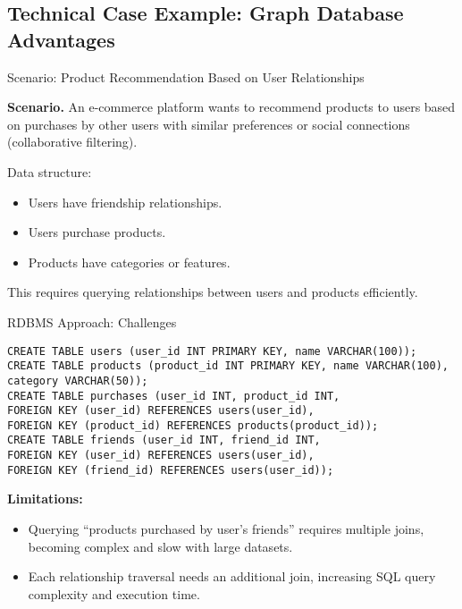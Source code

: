 \documentclass[aspectratio=169, table]{beamer}
\begin{document}
\subsection{Technical Case Example: Graph Database Advantages}

\begin{frame}{\Large{Scenario: Product Recommendation Based on User Relationships}}
	\vspace{20pt}
	
	\textbf{Scenario.} An e-commerce platform wants to recommend products to users based on purchases by other users with similar preferences or social connections (collaborative filtering).
	
	\vspace{10pt}
	Data structure:
	\begin{itemize}
		\item Users have friendship relationships.
		\item Users purchase products.
		\item Products have categories or features.
	\end{itemize}
	
	This requires querying relationships between users and products efficiently.
	
\end{frame}

\begin{frame}[fragile]{RDBMS Approach: Challenges}
\vspace{20pt}	
\begin{lstlisting}[style=SqlStyle]
CREATE TABLE users (user_id INT PRIMARY KEY, name VARCHAR(100));
CREATE TABLE products (product_id INT PRIMARY KEY, name VARCHAR(100), category VARCHAR(50));
CREATE TABLE purchases (user_id INT, product_id INT,
FOREIGN KEY (user_id) REFERENCES users(user_id),
FOREIGN KEY (product_id) REFERENCES products(product_id));
CREATE TABLE friends (user_id INT, friend_id INT,
FOREIGN KEY (user_id) REFERENCES users(user_id),
FOREIGN KEY (friend_id) REFERENCES users(user_id));
\end{lstlisting}

	\textbf{Limitations:}
	\begin{itemize}
		\item Querying “products purchased by user’s friends” requires multiple joins, becoming complex and slow with large datasets.
		\item Each relationship traversal needs an additional join, increasing SQL query complexity and execution time.
	\end{itemize}
	
\end{frame}
\end{document}
